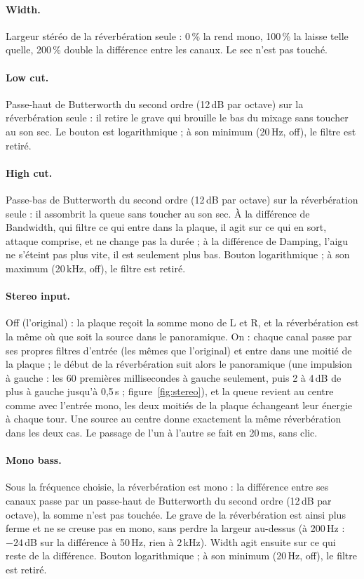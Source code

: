 \documentclass[a4paper,11pt]{article}
\newcommand{\dB}{\,dB}
\begin{document}
\paragraph{Width.} Largeur stéréo de la réverbération seule : 0\,\% la rend mono, 100\,\% la
laisse telle quelle, 200\,\% double la différence entre les canaux. Le sec n'est pas touché.

\paragraph{Low cut.} Passe-haut de Butterworth du second ordre (12\dB{} par octave) sur la
réverbération seule : il retire le grave qui brouille le bas du mixage sans toucher au son sec.
Le bouton est logarithmique ; à son minimum (20\,Hz, \og off\fg), le filtre est retiré.

\paragraph{High cut.} Passe-bas de Butterworth du second ordre (12\dB{} par octave) sur la
réverbération seule : il assombrit la queue sans toucher au son sec. À la différence de
Bandwidth, qui filtre ce qui entre dans la plaque, il agit sur ce qui en sort, attaque comprise,
et ne change pas la durée ; à la différence de Damping, l'aigu ne s'éteint pas plus vite, il est
seulement plus bas. Bouton logarithmique ; à son maximum (20\,kHz, \og off\fg), le filtre est
retiré.

\paragraph{Stereo input.} Off (l'original) : la plaque reçoit la somme mono de L et R, et la
réverbération est la même où que soit la source dans le panoramique. On : chaque canal passe par
ses propres filtres d'entrée (les mêmes que l'original) et entre dans une moitié de la plaque ;
le début de la réverbération suit alors le panoramique (une impulsion à gauche : les
60 premières millisecondes à gauche seulement, puis 2 à 4\dB{} de plus à gauche jusqu'à 0,5\,s ;
figure~\ref{fig:stereo}), et la queue revient au centre comme avec l'entrée mono, les deux
moitiés de la plaque échangeant leur énergie à chaque tour. Une source au centre donne exactement la même réverbération dans les deux cas. Le passage
de l'un à l'autre se fait en 20\,ms, sans clic.

\paragraph{Mono bass.} Sous la fréquence choisie, la réverbération est mono : la différence
entre ses canaux passe par un passe-haut de Butterworth du second ordre (12\dB{} par octave), la
somme n'est pas touchée. Le grave de la réverbération est ainsi plus ferme et ne se creuse pas
en mono, sans perdre la largeur au-dessus (à 200\,Hz : $-24$\dB{} sur la différence à 50\,Hz,
rien à 2\,kHz). Width agit ensuite sur ce qui reste de la différence. Bouton logarithmique ; à
son minimum (20\,Hz, \og off\fg), le filtre est retiré.
\end{document}
